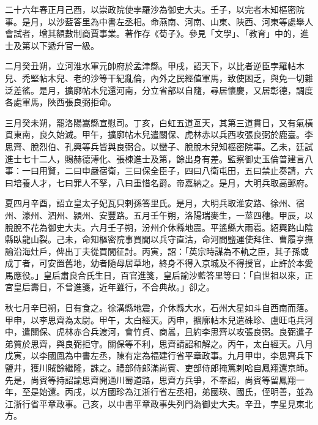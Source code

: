 
\begin{pinyinscope}

 二十六年春正月己酉，以崇政院使孛羅沙為御史大夫。壬子，以完者木知樞密院事。是月，以沙藍答里為中書左丞相。命燕南、河南、山東、陜西、河東等處舉人會試者，增其額數制商賈事業。著作存《荀子》。參見「文學」、「教育」中的，進士及第以下遞升官一級。



 二月癸丑朔，立河淮水軍元帥府於孟津縣。甲戌，詔天下，以比者逆臣孛羅帖木兒、禿堅帖木兒、老的沙等干紀亂倫，內外之民經值軍馬，致使困乏，與免一切雜泛差徭。是月，擴廓帖木兒還河南，分立省部以自隨，尋居懷慶，又居彰德，調度各處軍馬，陜西張良弼拒命。



 三月癸未朔，罷洛陽嵩縣宣慰司。丁亥，白虹五道亙天，其第三道貫日，又有氣橫貫東南，良久始滅。甲午，擴廓帖木兒遣關保、虎林赤以兵西攻張良弼於鹿臺。李思齊、脫烈伯、孔興等兵皆與良弼合。以蠻子、脫脫木兒知樞密院事。乙未，廷試進士七十二人，賜赫德溥化、張棟進士及第，餘出身有差。監察御史玉倫普建言八事：一曰用賢，二曰申嚴宿衛，三曰保全臣子，四曰八衛屯田，五曰禁止奏請，六曰培養人才，七曰罪人不孥，八曰重惜名爵。帝嘉納之。是月，大明兵取高郵府。



 夏四月辛酉，詔立皇太子妃瓦只剌孫答里氏。是月，大明兵取淮安路、徐州、宿州、濠州、泗州、潁州、安豐路。五月壬午朔，洛陽瑞麥生，一莖四穗。甲辰，以脫脫不花為御史大夫。六月壬子朔，汾州介休縣地震。平遙縣大雨雹。紹興路山陰縣臥龍山裂。己未，命知樞密院事買閭以兵守直沽，命河間鹽運使拜住、曹履亨撫諭沿海灶戶，俾出丁夫從買閭征討。丙寅，詔：「英宗時謀為不軌之臣，其子孫或成丁者，可安置舊地，幼者隨母居草地，終身不得入京城及不得授官，止許於本愛馬應役。」皇后肅良合氏生日，百官進箋，皇后諭沙藍答里等曰：「自世祖以來，正宮皇后壽日，不曾進箋，近年雖行，不合典故。」卻之。



 秋七月辛巳朔，日有食之。徐溝縣地震，介休縣大水，石州大星如斗自西南而落。甲申，以李思齊為太尉。甲午，太白經天。丙申，擴廓帖木兒遣硃珍、盧旺屯兵河中，遣關保、虎林赤合兵渡河，會竹貞、商暠，且約李思齊以攻張良弼。良弼遣子弟質於思齊，與良弼拒守。關保等不利，思齊請詔和解之。丙午，太白經天。八月戊寅，以李國鳳為中書左丞，陳有定為福建行省平章政事。九月甲申，李思齊兵下鹽井，獲川賊餘繼隆，誅之。禮部侍郎滿尚賓、吏部侍郎掩篤剌哈自鳳翔還京師。先是，尚賓等持詔諭思齊開通川蜀道路，思齊方兵爭，不奉詔，尚賓等留鳳翔一年，至是始還。丙戌，以方國珍為江浙行省左丞相，弟國瑛、國氏，侄明善，並為江浙行省平章政事。己亥，以中書平章政事失列門為御史大夫。辛丑，孛星見東北方。




\end{pinyinscope}
